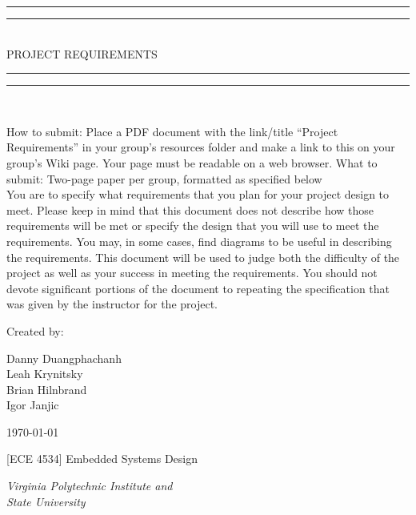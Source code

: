 
\begin{titlepage}

\centering
\vspace*{\baselineskip}

\rule{\textwidth}{1.6pt}\vspace*{-\baselineskip}\vspace*{2pt}
\rule{\textwidth}{0.4pt}\\[\baselineskip]

{\LARGE PROJECT REQUIREMENTS}\\[0.2\baselineskip]

\rule{\textwidth}{0.4pt}\vspace*{-\baselineskip}\vspace{3.2pt}
\rule{\textwidth}{1.6pt}\\[\baselineskip]

\wl

\scshape
{\small How to submit: Place a PDF document with the link/title ``Project
Requirements'' in your group's resources folder and make a link to this on your
group's Wiki page. Your page must be readable on a web browser. What to submit:
Two-page paper per group, formatted as specified below\\
 
You are to specify what requirements that you plan for your project design to
meet. Please keep in mind that this document does not describe how those
requirements will be met or specify the design that you will use to meet the
requirements. You may, in some cases, find diagrams to be useful in describing
the requirements. This document will be used to judge both the difficulty of
the project as well as your success in meeting the requirements. You should not
devote significant portions of the document to repeating the specification that
was given by the instructor for the project.\\[\baselineskip]\par}

\vfill

Created by:\\[0.3\baselineskip]
{Danny Duangphachanh\\ Leah Krynitsky\\ Brian Hilnbrand\\ Igor Janjic\par}
{\small \today\\\par}
{\small [ECE 4534] Embedded Systems Design\\\par}
{\small\itshape Virginia Polytechnic Institute and\\ State University\par}


\end{titlepage}
